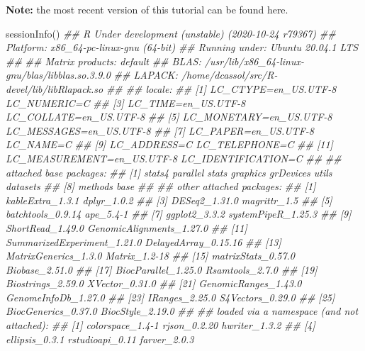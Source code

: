 \documentclass[14pt,]{article}
\newcommand{\hlcom}[1]{\textcolor[rgb]{0.502,0.502,0.502}{\textit{#1}}}%
\newcommand{\hlstd}[1]{\textcolor[rgb]{0.251,0.251,0.251}{#1}}%
\newcommand{\hlkwd}[1]{\textcolor[rgb]{0.878,0.439,0.125}{#1}}%
\newenvironment{Shaded}{\begin{myshaded}}{\end{myshaded}}
\newcommand{\KeywordTok}[1]{\hlkwd{#1}}
\newcommand{\CommentTok}[1]{\hlcom{#1}}
\newcommand{\NormalTok}[1]{\hlstd{#1}}
\begin{document}
\textbf{Note:} the most recent version of this tutorial can be found here.

\begin{Shaded}
\begin{Highlighting}[]
\KeywordTok{sessionInfo}\NormalTok{()}
\CommentTok{## R Under development (unstable) (2020-10-24 r79367)}
\CommentTok{## Platform: x86_64-pc-linux-gnu (64-bit)}
\CommentTok{## Running under: Ubuntu 20.04.1 LTS}
\CommentTok{## }
\CommentTok{## Matrix products: default}
\CommentTok{## BLAS:   /usr/lib/x86_64-linux-gnu/blas/libblas.so.3.9.0}
\CommentTok{## LAPACK: /home/dcassol/src/R-devel/lib/libRlapack.so}
\CommentTok{## }
\CommentTok{## locale:}
\CommentTok{##  [1] LC_CTYPE=en_US.UTF-8       LC_NUMERIC=C              }
\CommentTok{##  [3] LC_TIME=en_US.UTF-8        LC_COLLATE=en_US.UTF-8    }
\CommentTok{##  [5] LC_MONETARY=en_US.UTF-8    LC_MESSAGES=en_US.UTF-8   }
\CommentTok{##  [7] LC_PAPER=en_US.UTF-8       LC_NAME=C                 }
\CommentTok{##  [9] LC_ADDRESS=C               LC_TELEPHONE=C            }
\CommentTok{## [11] LC_MEASUREMENT=en_US.UTF-8 LC_IDENTIFICATION=C       }
\CommentTok{## }
\CommentTok{## attached base packages:}
\CommentTok{## [1] stats4    parallel  stats     graphics  grDevices utils     datasets }
\CommentTok{## [8] methods   base     }
\CommentTok{## }
\CommentTok{## other attached packages:}
\CommentTok{##  [1] kableExtra_1.3.1            dplyr_1.0.2                }
\CommentTok{##  [3] DESeq2_1.31.0               magrittr_1.5               }
\CommentTok{##  [5] batchtools_0.9.14           ape_5.4-1                  }
\CommentTok{##  [7] ggplot2_3.3.2               systemPipeR_1.25.3         }
\CommentTok{##  [9] ShortRead_1.49.0            GenomicAlignments_1.27.0   }
\CommentTok{## [11] SummarizedExperiment_1.21.0 DelayedArray_0.15.16       }
\CommentTok{## [13] MatrixGenerics_1.3.0        Matrix_1.2-18              }
\CommentTok{## [15] matrixStats_0.57.0          Biobase_2.51.0             }
\CommentTok{## [17] BiocParallel_1.25.0         Rsamtools_2.7.0            }
\CommentTok{## [19] Biostrings_2.59.0           XVector_0.31.0             }
\CommentTok{## [21] GenomicRanges_1.43.0        GenomeInfoDb_1.27.0        }
\CommentTok{## [23] IRanges_2.25.0              S4Vectors_0.29.0           }
\CommentTok{## [25] BiocGenerics_0.37.0         BiocStyle_2.19.0           }
\CommentTok{## }
\CommentTok{## loaded via a namespace (and not attached):}
\CommentTok{##   [1] colorspace_1.4-1         rjson_0.2.20             hwriter_1.3.2           }
\CommentTok{##   [4] ellipsis_0.3.1           rstudioapi_0.11          farver_2.0.3            }

\end{Highlighting}
\end{Shaded}
\end{document}
